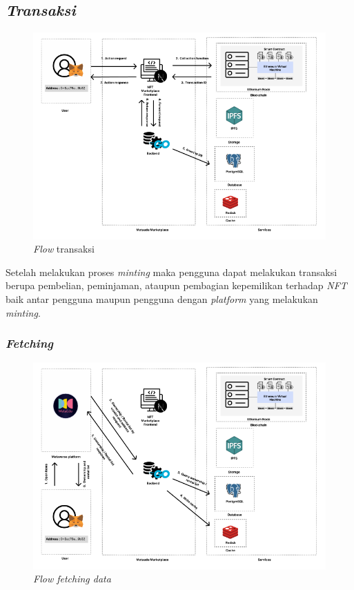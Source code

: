 \subsection{\emph{Transaksi}}

\begin{figure} [H] \centering
  \includegraphics[scale=0.6]{gambar/img-integration-action.png}
  \caption{\emph{Flow} transaksi}
  \label{fig:ActionIntegration}
\end{figure}

Setelah melakukan proses \emph{minting} maka pengguna dapat melakukan transaksi berupa pembelian, peminjaman, ataupun pembagian kepemilikan terhadap \emph{NFT} baik antar pengguna maupun pengguna dengan \emph{platform} yang melakukan \emph{minting}.

\subsubsection{\emph{Fetching}}

\begin{figure} [H] \centering
  \includegraphics[scale=0.6]{gambar/img-integration-fetching.png}
  \caption{\emph{Flow fetching data}}
  \label{fig:FetchingIntegration}
\end{figure}

